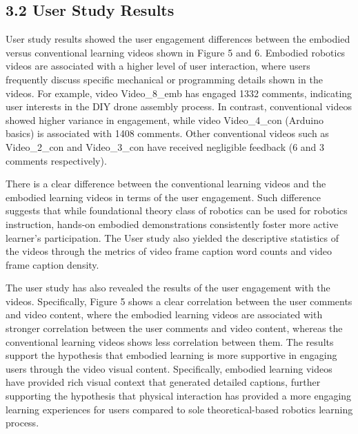\documentclass[12pt]{article}
\begin{document}
\subsection*{3.2 User Study Results}

\datatable





User study results showed the user engagement differences between the embodied versus conventional learning videos shown in Figure 5 and 6. Embodied robotics videos are associated with a higher level of user interaction, where users frequently discuss specific mechanical or programming details shown in the videos. For example, video Video\_8\_emb has engaged 1332 comments, indicating user interests in the DIY drone assembly process. In contrast, conventional videos showed higher variance in engagement, while video Video\_4\_con (Arduino basics) is associated with 1408 comments. Other conventional videos such as Video\_2\_con and Video\_3\_con have received negligible feedback (6 and 3 comments respectively). 

There is a clear difference between the conventional learning videos and the embodied learning videos in terms of the user engagement. Such difference suggests that while foundational theory class of robotics can be used for robotics instruction, hands-on embodied demonstrations consistently foster more active learner's participation. The User study also yielded the descriptive statistics of the videos through the metrics of video frame caption word counts and video frame caption density.


The user study has also revealed the results of the user engagement with the videos. Specifically, Figure 5 shows a clear correlation between the user comments and video content, where the embodied learning videos are associated with stronger correlation between the user comments and video content, whereas the conventional learning videos shows less correlation between them. The results support the hypothesis that embodied learning is more supportive in engaging users through the video visual content. Specifically, embodied learning videos have provided rich visual context that generated detailed captions, further supporting the hypothesis that physical interaction has provided a more engaging learning experiences for users compared to sole theoretical-based robotics learning process.
\end{document}
